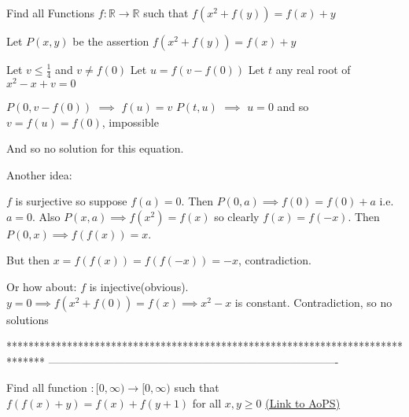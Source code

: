 \begin{solution}
	\begin{tcolorbox}Find all Functions $ f:\mathbb{R}\rightarrow\mathbb{R} $ such that 
$f(x^2+f(y))=f(x)+y$\end{tcolorbox}
Let $P(x,y)$ be the assertion $f(x^2+f(y))=f(x)+y$

Let $v\le\frac 14$ and $v\ne f(0)$ 
Let $u=f(v-f(0))$
Let $t$ any real root of $x^2-x+v=0$ 

$P(0,v-f(0))$ $\implies$ $f(u)=v$ 
$P(t,u)$ $\implies$ $u=0$ and so $v=f(u)=f(0)$, impossible 

And so no solution for this equation.
\end{solution}



\begin{solution}
	Another idea:

$f$ is surjective so suppose $f(a)=0$. Then $P(0,a)\implies f(0)=f(0)+a$ i.e. $a=0$. Also $P(x,a)\implies f(x^2)=f(x)$ so clearly $f(x)=f(-x)$. Then $P(0,x)\implies f(f(x))=x$.

But then $x=f(f(x))=f(f(-x))=-x$, contradiction.
\end{solution}



\begin{solution}
	Or how about:
$f$ is injective(obvious).
$y=0 \implies f(x^{2}+f(0))=f(x) \implies x^{2}-x$ is constant. Contradiction, so no solutions
\end{solution}
*******************************************************************************
-------------------------------------------------------------------------------

\begin{problem}
	Find all function $: [0,\infty) \rightarrow [0,\infty)$ such that $ f(f(x)+y) = f(x) + f(y+1) $ for all $ x,y \ge 0 $
	\flushright \href{https://artofproblemsolving.com/community/c6h470638}{(Link to AoPS)}
\end{problem}



